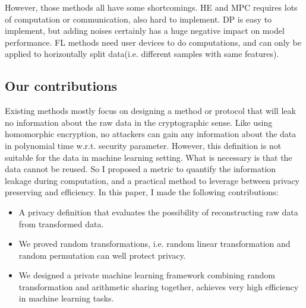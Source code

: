However, those methods all have some shortcomings. HE and MPC requires lots of computation or communication,  also hard to implement. DP is easy to implement, but adding noises certainly has a huge negative impact on model performance. FL methods need user devices to do computations, and can only be applied to horizontally split data(i.e. different samples with same features).

\subsection{Our contributions}
Existing methods mostly focus on designing a method or protocol that will leak no information about the raw data in the cryptographic sense. Like using homomorphic encryption, no attackers can gain any information about the data in polynomial time w.r.t. security parameter. However, this definition is not suitable for the data in machine learning setting. What is necessary is that the data cannot be reused. So I proposed a metric to quantify the information leakage during computation, and a practical method to leverage between privacy preserving and efficiency.
In this paper, I made the following contributions:
\begin{itemize}
    \item A privacy definition that evaluates the possibility of reconstructing raw data from transformed data.
    \item We proved random transformations, i.e. random linear transformation and random permutation can well protect privacy.
    \item We designed a private machine learning framework combining random transformation and arithmetic sharing together, achieves very high efficiency in machine learning tasks.
\end{itemize}
